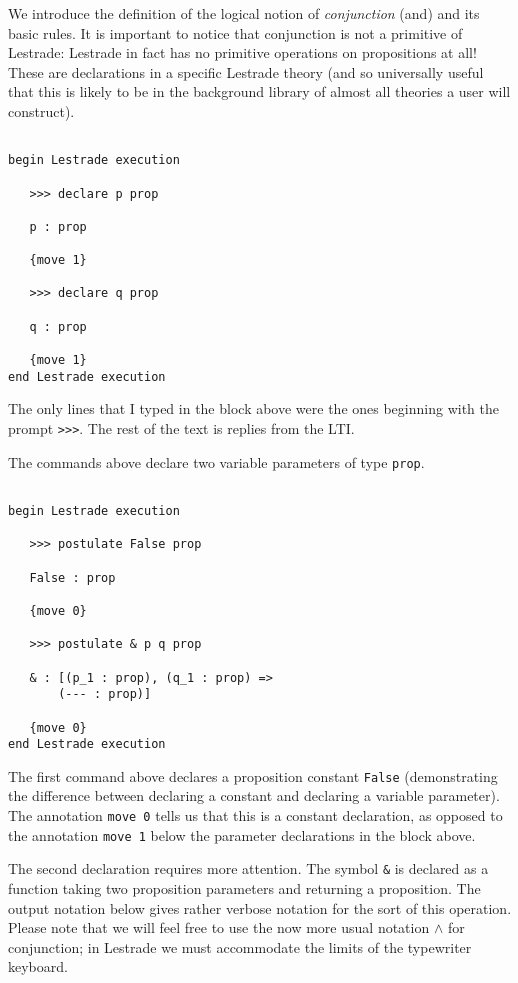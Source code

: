 \documentclass[12pt]{article}
\begin{document}
We introduce the definition of the logical notion of {\em conjunction\/} (and) and its basic rules.  It is important to
notice that conjunction is not a primitive of Lestrade:  Lestrade in fact has no primitive operations on propositions at all!
These are declarations in a specific Lestrade theory (and so universally useful that this is likely to be in the background library of almost all theories a user will construct).

\begin{verbatim}

begin Lestrade execution

   >>> declare p prop

   p : prop

   {move 1}

   >>> declare q prop

   q : prop

   {move 1}
end Lestrade execution

\end{verbatim}

The only lines that I typed in the block above were the ones beginning with the prompt \verb|>>>|.  The rest of the text
is replies from the LTI.

The commands above declare two variable parameters of type {\tt prop}.

\newpage

\begin{verbatim}

begin Lestrade execution

   >>> postulate False prop

   False : prop

   {move 0}

   >>> postulate & p q prop

   & : [(p_1 : prop), (q_1 : prop) => 
       (--- : prop)]

   {move 0}
end Lestrade execution

\end{verbatim}

The first command above declares a proposition constant {\tt False} (demonstrating the difference between declaring a constant and declaring a variable parameter).  The annotation \verb|move 0| tells us that this is a constant declaration, as opposed to the annotation \verb |move 1| below the parameter declarations in the block above.

The second declaration requires more attention.  The symbol \verb|&| is declared as a function taking two proposition parameters and returning a proposition.  The output notation below gives rather verbose notation for the sort of this operation.  Please note that we will feel free to use the now more usual notation $\wedge$ for conjunction;  in Lestrade we must accommodate the limits of the typewriter keyboard.
\end{document}

